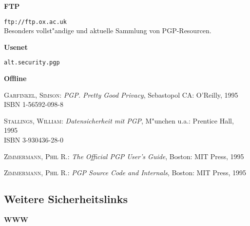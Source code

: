 \noindent \textbf{FTP}

\begin{description}
  

\item \texttt{ftp://ftp.ox.ac.uk} \\
  Besonders vollst"andige und aktuelle Sammlung von PGP-Resourcen.

\end{description}

\noindent \textbf{Usenet}

\begin{description}
  
\item \texttt{alt.security.pgp}

\end{description}

\noindent \textbf{Offline}

\begin{description}
  
\item \textsc{Garfinkel, Simson}: \textit{PGP. Pretty Good Privacy},
  Sebastopol CA: O'Reilly, 1995 \\
  ISBN 1-56592-098-8
  
\item \textsc{Stallings, William}: \textit{Datensicherheit mit PGP},
  M"unchen u.a.: Prentice Hall, 1995 \\
  ISBN 3-930436-28-0
  
\item \textsc{Zimmermann, Phil R.}: \textit{The Official PGP User's
    Guide}, Boston: MIT Press, 1995
  
\item \textsc{Zimmermann, Phil R.}: \textit{PGP Source Code and
    Internals}, Boston: MIT Press, 1995

\end{description}


\subsection{Weitere Sicherheitslinks}

\textbf{WWW}

